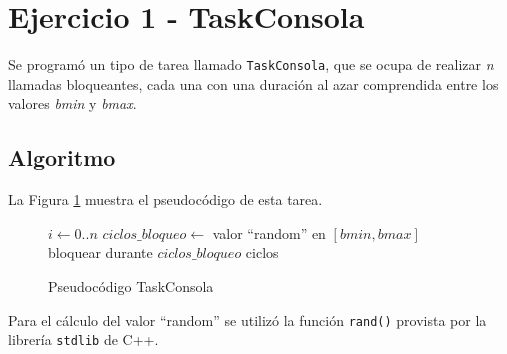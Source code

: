 \section{Ejercicio 1 - TaskConsola}

Se programó un tipo de tarea llamado {\tt TaskConsola}, que se ocupa de realizar {\it n} llamadas bloqueantes, cada una con una duración al azar comprendida entre los valores {\it bmin} y {\it bmax}.

\subsection{Algoritmo}

La Figura \ref{cod-tconsola} muestra el pseudocódigo de esta tarea.

\begin{figure}[!htb]
\begin{codebox}
\li \For $i \leftarrow 0 .. n$
\li \Do 	$ciclos\_bloqueo \leftarrow$ valor ``random'' en $[bmin,bmax]$
\li 		bloquear durante $ciclos\_bloqueo$ ciclos
\End
\end{codebox}
\caption{Pseudocódigo TaskConsola}\label{cod-tconsola}
\end{figure}

Para el cálculo del valor ``random'' se utilizó la función {\tt rand()} provista por la librería {\tt stdlib} de C++.